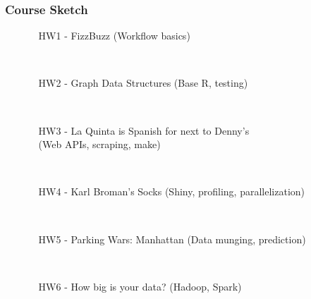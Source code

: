 \documentclass[12pt]{beamer}
\begin{document}

\begin{frame}[t]
\frametitle{Course Sketch}

\begin{enumerate}

\item[]
    
\begin{enumerate}

\item[\qquad HW1 - ] FizzBuzz {\scriptsize(Workflow basics)}

~\\

\item[\qquad HW2 - ] Graph Data Structures {\scriptsize(Base R, testing)}

~\\

\item[\qquad HW3 - ] La Quinta is Spanish for next to Denny's \\ {\scriptsize(Web APIs, scraping, make)}

~\\

\item[\qquad HW4 - ] Karl Broman's Socks {\scriptsize(Shiny, profiling, parallelization)}

~\\

\item[\qquad HW5 - ] Parking Wars: Manhattan {\scriptsize(Data munging, prediction)}

~\\

\item[\qquad HW6 - ] How big is your data? {\scriptsize(Hadoop, Spark)}

\end{enumerate}

\end{enumerate}
    
\end{frame}

\end{document}
